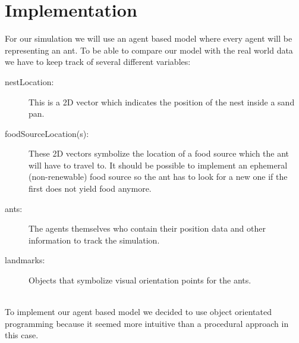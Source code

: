 \documentclass[11pt]{article}
\begin{document}
\newpage

\section{Implementation}
For our simulation we will use an agent based model where every agent will be representing an ant. To be able to compare our model with the real world data we have to keep track of several different variables:
\begin{description}
\item[nestLocation:] This is a 2D vector which indicates the position of the nest inside a sand pan.
\item[foodSourceLocation(s): ]These 2D vectors symbolize the location of a food source which the ant will have to travel to. It should be possible to implement an ephemeral (non-renewable) food source so the ant has to look for a new one if the first does not yield food anymore.
\item [ants: ]The agents themselves who contain their position data and other information to track the simulation.
\item[landmarks:]Objects that symbolize visual orientation points for the ants.
\end{description}
\ \\
To implement our agent based model we decided to use object orientated programming because it
seemed more intuitive than a procedural approach in this case.
\end{document}
